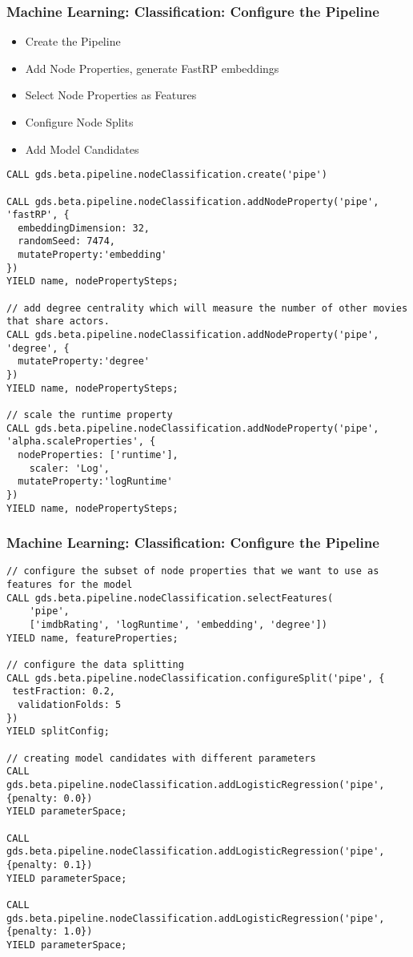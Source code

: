 \begin{frame}[fragile]\frametitle{Machine Learning: Classification: Configure the Pipeline}

\begin{itemize}
\item Create the Pipeline
\item Add Node Properties, generate FastRP embeddings
\item Select Node Properties as Features
\item Configure Node Splits
\item Add Model Candidates
\end{itemize}

\begin{lstlisting}
CALL gds.beta.pipeline.nodeClassification.create('pipe')

CALL gds.beta.pipeline.nodeClassification.addNodeProperty('pipe', 'fastRP', {
  embeddingDimension: 32,
  randomSeed: 7474,
  mutateProperty:'embedding'
})
YIELD name, nodePropertySteps;

// add degree centrality which will measure the number of other movies that share actors.
CALL gds.beta.pipeline.nodeClassification.addNodeProperty('pipe', 'degree', {
  mutateProperty:'degree'
})
YIELD name, nodePropertySteps;

// scale the runtime property
CALL gds.beta.pipeline.nodeClassification.addNodeProperty('pipe', 'alpha.scaleProperties', {
  nodeProperties: ['runtime'],
    scaler: 'Log',
  mutateProperty:'logRuntime'
})
YIELD name, nodePropertySteps;
\end{lstlisting}
\end{frame}

\begin{frame}[fragile]\frametitle{Machine Learning: Classification: Configure the Pipeline}

\begin{lstlisting}
// configure the subset of node properties that we want to use as features for the model
CALL gds.beta.pipeline.nodeClassification.selectFeatures(
    'pipe',
    ['imdbRating', 'logRuntime', 'embedding', 'degree'])
YIELD name, featureProperties;

// configure the data splitting
CALL gds.beta.pipeline.nodeClassification.configureSplit('pipe', {
 testFraction: 0.2,
  validationFolds: 5
})
YIELD splitConfig;

// creating model candidates with different parameters
CALL gds.beta.pipeline.nodeClassification.addLogisticRegression('pipe', {penalty: 0.0})
YIELD parameterSpace;

CALL gds.beta.pipeline.nodeClassification.addLogisticRegression('pipe', {penalty: 0.1})
YIELD parameterSpace;

CALL gds.beta.pipeline.nodeClassification.addLogisticRegression('pipe', {penalty: 1.0})
YIELD parameterSpace;
\end{lstlisting}
\end{frame}


